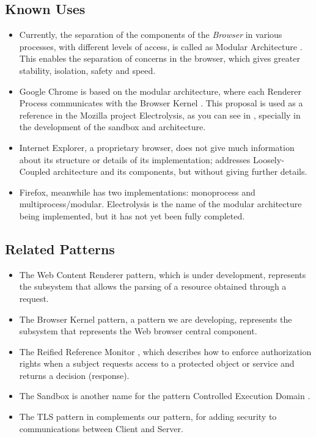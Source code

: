 \documentclass{sig-alternate-05-2015}
\begin{document}
  \subsection*{Known Uses}
  \begin{itemize}
    \item Currently, the separation of the components of the \textit{Browser} in various processes, with different levels of access, is called as Modular Architecture \cite{Vrbanec2013}. This enables the separation of concerns in the browser, which gives greater stability, isolation, safety and speed.
    \item Google Chrome is based on the modular architecture, where each Renderer Process communicates with the Browser Kernel \cite{multiProcGC}. This proposal is used as a reference in the Mozilla project Electrolysis, as you can see in \cite{FirefoxThreatModel,featuresE10S}, specially in the development of the sandbox and architecture.
    \item Internet Explorer, a proprietary browser, does not give much information about its structure or details of its implementation; \cite{Crowley2010} addresses Loosely-Coupled architecture \cite{IE8-LCIE} and its components, but without giving further details. 
    \item Firefox, meanwhile has two implementations: monoprocess and multiprocess/modular. Electrolysis is the name of the modular architecture being implemented, but it has not yet been fully completed.
  \end{itemize}

  \subsection*{Related Patterns}
  \begin{itemize}
    \item The Web Content Renderer pattern, which is under development, represents the subsystem that allows the parsing of a resource obtained through a request.
    \item The Browser Kernel pattern, a pattern we are developing, represents the subsystem that represents the Web browser central component. 
    \item The Reified Reference Monitor \cite{fernandez2013security}, which describes how to enforce authorization rights when a subject requests access to a protected object or service and returns a decision (response). 
    \item The Sandbox is another name for the pattern Controlled Execution Domain \cite{fernandez2013security}.
    \item The TLS pattern in \cite{fernandez2013security} complements our pattern, for adding security to communications between Client and Server.
  \end{itemize}
\end{document}
